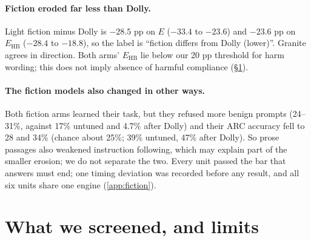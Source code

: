 \documentclass{article}
\newcommand{\Ehb}{E_{\mathrm{HB}}}
\begin{document}
\paragraph{Fiction eroded far less than Dolly.} Light fiction minus Dolly is
$-28.5$ pp on $E$ ($-33.4$ to $-23.6$) and $-23.6$ pp on $\Ehb$ ($-28.4$ to
$-18.8$), so the label is ``fiction differs from Dolly (lower)''. Granite
agrees in direction. Both arms' $\Ehb$ lie below our 20 pp threshold for harm
wording; this does not imply absence of harmful compliance (\S\ref{sec:screened}).

\paragraph{The fiction models also changed in other ways.} Both fiction arms
learned their task, but they refused more benign prompts (24--31\%, against
17\% untuned and 4.7\% after Dolly) and their ARC accuracy fell to 28 and 34\%
(chance about 25\%; 39\% untuned, 47\% after Dolly). So prose passages also
weakened instruction following, which may explain part of the smaller erosion;
we do not separate the two. Every unit passed the bar that answers must end;
one timing deviation was recorded before any result, and all six units share
one engine (\cref{app:fiction}).

\section{What we screened, and limits}
\label{sec:screened}
\end{document}
